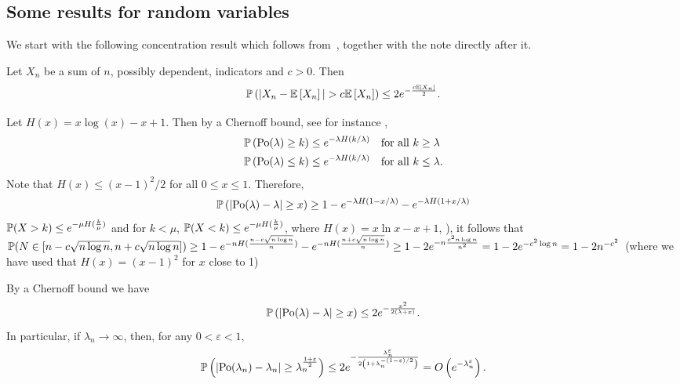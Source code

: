 \begin{appendices}
\section{Some results for random variables}

We start with the following concentration result which follows from~\cite[Theorem 4]{freedman1973another}, together with the note directly after it.

\begin{lemma}\label{lem:general_concentration_sum_indicators}
Let $X_n$ be a sum of $n$, possibly dependent, indicators and $c > 0$. Then
\[
	\mathbb{P}\left(|X_n - \mathbb{E}\left[X_n\right]| > c \mathbb{E}\left[X_n\right]\right) \le 2 e^{-\frac{c \mathbb{E}\left[X_n\right]}{2}}.
\]
\end{lemma}

Let $H(x) = x\log(x) - x + 1$. Then by a Chernoff bound, see for instance \cite[Lemma 1.2]{penrose2003random},
\begin{align*}
	&\mathbb{P}\left({\mathrm{Po}}(\lambda) \ge k\right) \le e^{-\lambda H(k/\lambda)} \quad \text{for all } k \ge \lambda\\
	&\mathbb{P}\left({\mathrm{Po}}(\lambda) \le k\right) \le e^{-\lambda H(k/\lambda)} \quad \text{for all } k \le \lambda.
\end{align*}
Note that $H(x) \le (x-1)^2/2$ for all $0 \le x \le 1$. Therefore, 
\begin{align*}
	\mathbb{P}\left(\left|\mathrm{Po}(\lambda) - \lambda\right| \ge x\right) \ge 1 - e^{-\lambda H(1 - x/\lambda)} - e^{-\lambda H(1 + x/\lambda)}
\end{align*}
 $\mathbb{P}(X >k) \leq e^{-\mu H(\frac{k}{\mu})}$ and for $k<\mu$, $\mathbb{P}(X< k) \leq e^{-\mu H(\frac{k}{\mu})}$, where $H(x) = x\ln x -x+1$, \cite{Penrose2003}), it follows that $\mathbb{P}(N \in [n-c\sqrt{n\log n},n+c\sqrt{n\log n}]) \geq 1-e^{-n H(\frac{n-c\sqrt{n\log n}}{n})}-e^{-nH(\frac{n+c\sqrt{n \log n}}{n})} \geq  1-2e^{-n \frac{c^2 n \log n}{n^2}} = 1-2e^{-c^2\log n}=1-2n^{-c^2}$ (where we have used that $H(x) = (x-1)^2$ for $x$ close to 1)

By a Chernoff bound we have
\begin{equation}\label{eq:def_chernoff_bound_poisson}
	\mathbb{P}\left(\left|\mathrm{Po}(\lambda) - \lambda\right| \ge x\right) \le 2e^{-\frac{x^2}{2(\lambda + x)}}.
\end{equation}
In particular, if $\lambda_n \to \infty$, then, for any $0 < \varepsilon < 1$,
\[
	\mathbb{P}\left(\left|\mathrm{Po}(\lambda_n) - \lambda_n\right| \ge \lambda_n^{\frac{1+\varepsilon}{2}}\right) \le 2e^{-\frac{\lambda_n^\varepsilon}{2\left(1 + \lambda_n^{-(1 - \varepsilon)/2}\right)}}
	= O\left(e^{-\lambda_n^\varepsilon}\right).
\]


\end{appendices}
